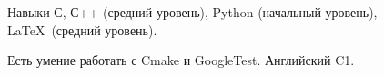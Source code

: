 
\begin{rubric}{Навыки}
	С,  С++ (средний уровень), Python (начальный уровень), \LaTeX\ (средний уровень). 
    
    Есть умение работать с Cmake и GoogleTest.
	Английский C1.


\end{rubric}
